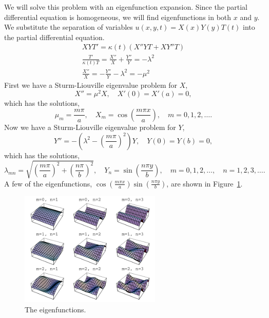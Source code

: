 {%
\begin{Solution}
  \label{solution heat rectangle non-constant diffusivity}
  We will solve this problem with an eigenfunction expansion.  Since the
  partial differential equation is homogeneous, we will find eigenfunctions
  in both $x$ and $y$.  We substitute the separation of variables
  $u(x,y,t) = X(x) Y(y) T(t)$ into the partial differential equation.
  \begin{gather*}
    X Y T' = \kappa(t) \left( X'' Y T + X Y'' T \right) \\
    \frac{T'}{\kappa(t) T} = \frac{X''}{X} + \frac{Y''}{Y} = -\lambda^2 \\
    \frac{X''}{X} = - \frac{Y''}{Y} - \lambda^2 = - \mu^2
  \end{gather*}
  First we have a Sturm-Liouville eigenvalue problem for $X$,
  \[
  X'' = \mu^2 X, \quad X'(0) = X'(a) = 0,
  \]
  which has the solutions,
  \[
  \mu_m = \frac{m \pi}{a}, \quad
  X_m = \cos \left( \frac{m \pi x}{a} \right), \quad
  m = 0, 1, 2, \ldots.
  \]
  Now we have a Sturm-Liouville eigenvalue problem for $Y$,
  \[
  Y'' = - \left( \lambda^2 - \left( \frac{m \pi}{a} \right)^2 \right) Y, \quad
  Y(0) = Y(b) = 0,
  \]
  which has the solutions,
  \[
  \lambda_{m n} = \sqrt{ \left( \frac{m \pi}{a} \right)^2 + \left(
      \frac{n \pi}{b} \right)^2 }, \quad
  Y_n = \sin \left( \frac{n \pi y}{b} \right), \quad
  m = 0,1,2,\ldots,\quad n = 1,2,3,\ldots.
  \]
  A few of the eigenfunctions,
  $\cos \left( \frac{m \pi x}{a} \right) \sin \left( \frac{n \pi y}{b} \right)$,
  are shown in Figure~\ref{cosmx_sinny}.

  \begin{figure}[h!]
    \begin{center}
      \includegraphics[width=0.6\textwidth]{pde/separation/cosmx_sinny}
    \end{center}
    \caption{The eigenfunctions.}
    \label{cosmx_sinny}
  \end{figure}


\end{Solution}}
